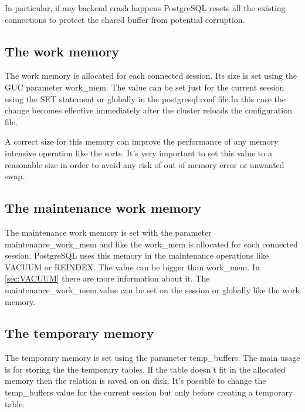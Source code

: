 In particular, if any backend crash happens PostgreSQL resets all the existing
connections to protect the shared buffer from potential corruption.

\subsection{The work memory}

\label{sub:WORKMEM}

The work memory is allocated for each connected session. Its size is set using
the GUC parameter work\_mem. The value can be set just for the current session
using the SET statement or globally in the postgresql.conf file.In this case
the change becomes effective immediately after the cluster reloads the
configuration file.\newline

A correct size for this memory can improve the performance of any memory
intensive operation like the sorts. It's very important to set this value to a
reasonable size in order to avoid any risk of out of memory error or unwanted
swap.\newline

\subsection{The maintenance work memory}

The maintenance work memory is set with the parameter maintenance\_work\_mem
and like the work\_mem is allocated for each connected session. PostgreSQL uses
this memory in the maintenance operations like VACUUM or REINDEX. The value can
be bigger than work\_mem. In \ref{sec:VACUUM} there are more information about
it. The maintenance\_work\_mem value can be set on the session or globally like
the work memory.

\subsection{The temporary memory}

\label{sub:TEMPBUF}

The temporary memory is set using the parameter temp\_buffers. The main usage
is for storing the the temporary tables. If the table doesn't fit in the
allocated memory then the relation is saved on on disk. It's possible to change
the temp\_buffers value for the current session but only before creating a
temporary table.

